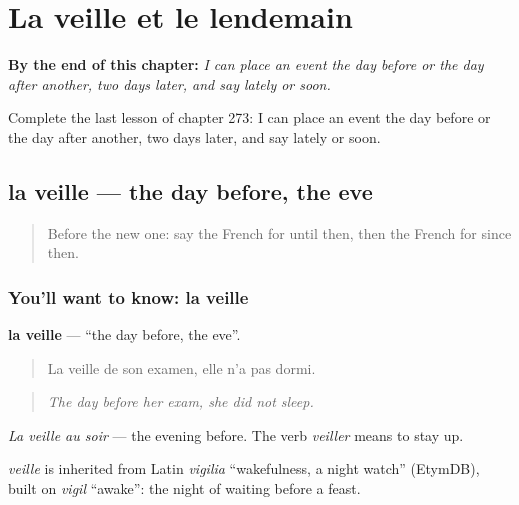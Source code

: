 
\chapter{La veille et le lendemain}
\label{ch:fr-la-veille-et-le-lendemain}

\begin{chapteropening}
\textbf{By the end of this chapter:} \emph{I can place an event the day before or the day after another, two days later, and say lately or soon.}

Complete the last lesson of chapter 273: I can place an event the day before or the day after another, two days later, and say lately or soon.
\end{chapteropening}

\section[la veille]{la veille — the day before, the eve}

\label{lesson:FR-C273-veille}



\begin{quote}
Before the new one: say the French for until then, then the French for since then.
\end{quote}

\subsection*{You'll want to know: la veille}
\textbf{la veille} — \textquotedblleft{}the day before, the eve\textquotedblright{}.

\begin{quote}
La veille de son examen, elle n'a pas dormi.
\end{quote}

\begin{quote}
\emph{The day before her exam, she did not sleep.}
\end{quote}

\emph{La veille au soir} — the evening before. The verb \emph{veiller} means to stay up.

\begin{cousinweb}
\emph{veille} is inherited from Latin \emph{vigilia} \textquotedblleft{}wakefulness, a night watch\textquotedblright{} (EtymDB), built on \emph{vigil} \textquotedblleft{}awake\textquotedblright{}: the night of waiting before a feast.
\end{cousinweb}

